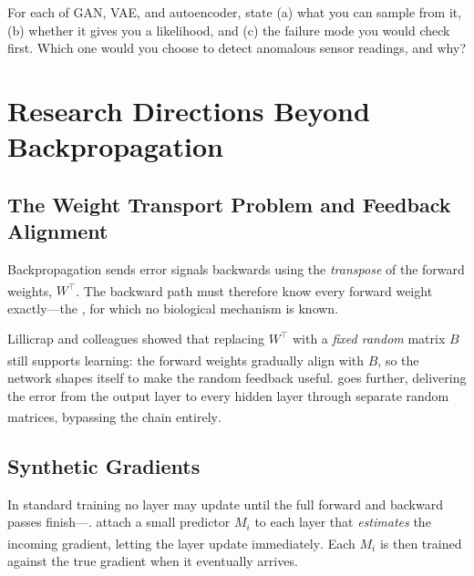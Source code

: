 \begin{checkpoint}
For each of GAN, VAE, and autoencoder, state (a) what you can sample from it,
(b) whether it gives you a likelihood, and (c) the failure mode you would check
first. Which one would you choose to detect anomalous sensor readings, and why?
\end{checkpoint}

\section{Research Directions Beyond Backpropagation}

\subsection{The Weight Transport Problem and Feedback Alignment}

Backpropagation sends error signals backwards using the \emph{transpose} of the
forward weights, $W^{\!\top}$\textsuperscript{\cite[][p.~3]{fischerVorlesungGrundlagenNeuronale2024}}.
The backward path must therefore know every forward weight exactly---the
, for which no biological mechanism is known.

Lillicrap and colleagues showed that replacing $W^{\!\top}$ with a \emph{fixed
random} matrix $B$ still supports
learning\textsuperscript{\cite{lillicrapRandomSynapticFeedback2016}}: the
forward weights gradually align with $B$, so the network shapes itself to make
the random feedback useful.  goes further,
delivering the error from the output layer to every hidden layer through
separate random matrices, bypassing the chain
entirely\textsuperscript{\cite{noklandDirectFeedbackAlignment2016}}.

\subsection{Synthetic Gradients}

In standard training no layer may update until the full forward and backward
passes finish---. 
attach a small predictor $M_i$ to each layer that \emph{estimates} the incoming
gradient, letting the layer update
immediately\textsuperscript{\cite{jaderbergDecoupledNeuralInterfaces2017}}. Each
$M_i$ is then trained against the true gradient when it eventually arrives.

